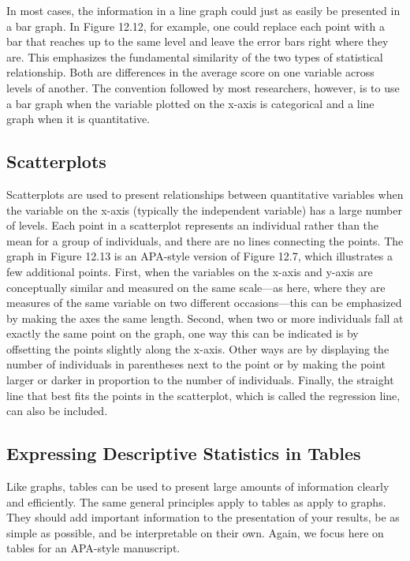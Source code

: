 In most cases, the information in a line graph could just as easily be presented in a bar graph. In Figure 12.12, for example, one could replace each point with a bar that reaches up to the same level and leave the error bars right where they are. This emphasizes the fundamental similarity of the two types of statistical relationship. Both are differences in the average score on one variable across levels of another. The convention followed by most researchers, however, is to use a bar graph when the variable plotted on the x-axis is categorical and a line graph when it is quantitative.

\subsection{Scatterplots}

Scatterplots are used to present relationships between quantitative variables when the variable on the x-axis (typically the independent variable) has a large number of levels. Each point in a scatterplot represents an individual rather than the mean for a group of individuals, and there are no lines connecting the points. The graph in Figure 12.13 is an APA-style version of Figure 12.7, which illustrates a few additional points. First, when the variables on the x-axis and y-axis are conceptually similar and measured on the same scale---as here, where they are measures of the same variable on two different occasions---this can be emphasized by making the axes the same length. Second, when two or more individuals fall at exactly the same point on the graph, one way this can be indicated is by offsetting the points slightly along the x-axis. Other ways are by displaying the number of individuals in parentheses next to the point or by making the point larger or darker in proportion to the number of individuals. Finally, the straight line that best fits the points in the scatterplot, which is called the regression line, can also be included.

\subsection{Expressing Descriptive Statistics in Tables}

Like graphs, tables can be used to present large amounts of information clearly and efficiently. The same general principles apply to tables as apply to graphs. They should add important information to the presentation of your results, be as simple as possible, and be interpretable on their own. Again, we focus here on tables for an APA-style manuscript.

